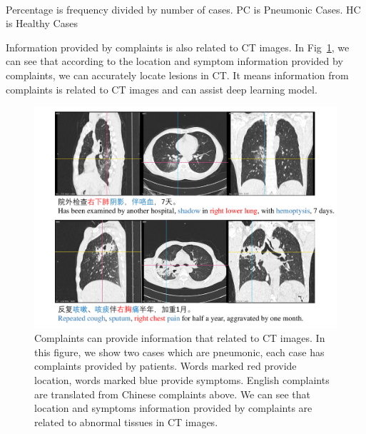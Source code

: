\begin{table}[htb]
\begin{center}
\begin{tabular}{|c|c|c|c|c|}
        \hline
        \end{tabular}
        \vspace{0.1cm}
        \label{frequency2}\\
        \footnotesize{Percentage is frequency divided by number of cases. PC is Pneumonic Cases. HC is Healthy Cases}
    
        \end{center}
        \vspace{-0.0cm}
        \end{table}

Information provided by complaints is also related to CT images. In Fig~\ref{txtpic}, we can see that according to the location and symptom information provided by complaints, we can accurately locate lesions in CT. It means information from complaints is related to CT images and can assist deep learning model.

\begin{figure}[t]
    \centerline{\includegraphics[width=180mm]{txtpic.pdf}}
    \vspace{-0cm}
    \caption{Complaints can provide information that related to CT images. In this figure, we show two cases which are pneumonic, each case has complaints provided by patients. Words marked red provide location, words marked blue provide symptoms. English complaints are translated from Chinese complaints above. We can see that location and symptoms information provided by complaints are related to abnormal tissues in CT images.}
    \vspace{-0cm}
    \label{txtpic}
    \end{figure}

